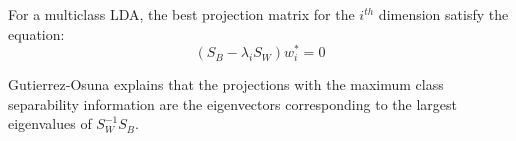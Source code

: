 For a multiclass LDA, the best projection matrix for the $i^{th}$ dimension satisfy the equation:
$$(S_B - \lambda_i S_W)w_{i}^* = 0$$

Gutierrez-Osuna\cite{gutierrez.osuna} explains that the projections with the maximum class separability information are the eigenvectors corresponding to the largest eigenvalues of $S_{W}^{-1} S_B$.

